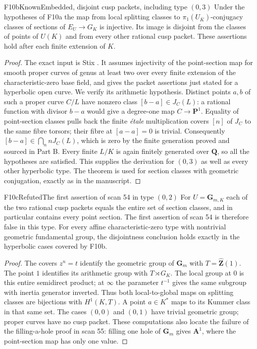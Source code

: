 \begin{result}{F10b}{Known}{Embedded, disjoint cusp packets, including type $(0,3)$}
Under the hypotheses of F10a the map from local splitting classes to
$\pi_1(U_{\overline K})$-conjugacy classes of sections of $E_U\to G_K$
is injective. Its image is disjoint from the classes of points of
$U(K)$ and from every other rational cusp packet. These assertions
hold after each finite extension of $K$.
\end{result}
\begin{proof}
The exact input is Stix \cite[Theorem 14(1)--(2)]{RootStix}.
It assumes injectivity of the point-section map for smooth proper curves
of genus at least two over every finite extension of the characteristic-zero
base field, and gives the packet assertions just stated for a hyperbolic
open curve. We verify its arithmetic hypothesis. Distinct points $a,b$
of such a proper curve $C/L$ have nonzero class $[b-a]\in J_C(L)$:
a rational function with divisor $b-a$ would give a degree-one map
$C\to\mathbf P^1$. Equality of point-section classes pulls back the
finite \emph{\'etale} multiplication covers $[n]$ of $J_C$ to the
same fibre torsors; their fibre at $[a-a]=0$ is trivial. Consequently
$[b-a]\in\bigcap_n nJ_C(L)$, which is zero by the finite generation
proved and sourced in Part B. Every finite $L/K$ is again finitely
generated over $\mathbf Q$, so all the hypotheses are satisfied.
This supplies the derivation for $(0,3)$ as well as every other
hyperbolic type. The theorem is used for section classes with geometric
conjugation, exactly as in the manuscript.
\end{proof}

\begin{result}{F10c}{Refuted}{The first assertion of scan 54 in type $(0,2)$}
For $U=\mathbf G_{m,K}$ each of the two rational cusp packets equals
the entire set of section classes, and in particular contains every
point section. The first assertion of scan 54 is therefore false in
this type. For every affine characteristic-zero type with nontrivial
geometric fundamental group, the disjointness conclusion holds exactly
in the hyperbolic cases covered by F10b.
\end{result}
\begin{proof}
The covers $z^n=t$ identify the geometric group of $\mathbf G_m$
with $T=\widehat{\mathbf Z}(1)$. The point $1$ identifies its
arithmetic group with $T\rtimes G_K$. The local group at $0$ is
this entire semidirect product; at $\infty$ the parameter $t^{-1}$
gives the same subgroup with inertia generator inverted. Thus both
local-to-global maps on splitting classes are bijections with
$H^1(K,T)$. A point $a\in K^*$ maps to its Kummer class in that
same set. The cases $(0,0)$ and $(0,1)$ have trivial geometric group;
proper curves have no cusp packet. These computations also locate the
failure of the filling-a-hole proof in scan 55: filling one hole of
$\mathbf G_m$ gives $\mathbf A^1$, where the point-section map has
only one value.
\end{proof}
